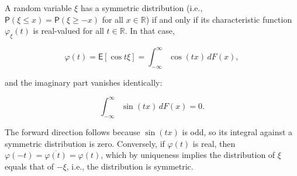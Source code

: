 A random variable $\xi$ has a symmetric distribution (i.e., $\mathsf{P}(\xi \leq x) = \mathsf{P}(\xi \geq -x)$ for all $x \in \mathbb{R}$) if and only if its characteristic function $\varphi_\xi(t)$ is real-valued for all $t \in \mathbb{R}$. In that case,

$$\varphi(t) = \mathsf{E}[\cos t\xi] = \int_{-\infty}^{\infty} \cos(tx) \, dF(x),$$

and the imaginary part vanishes identically:

$$\int_{-\infty}^{\infty} \sin(tx) \, dF(x) = 0.$$

The forward direction follows because $\sin(tx)$ is odd, so its integral against a symmetric distribution is zero. Conversely, if $\varphi(t)$ is real, then $\varphi(-t) = \overline{\varphi(t)} = \varphi(t)$, which by uniqueness implies the distribution of $\xi$ equals that of $-\xi$, i.e., the distribution is symmetric.
